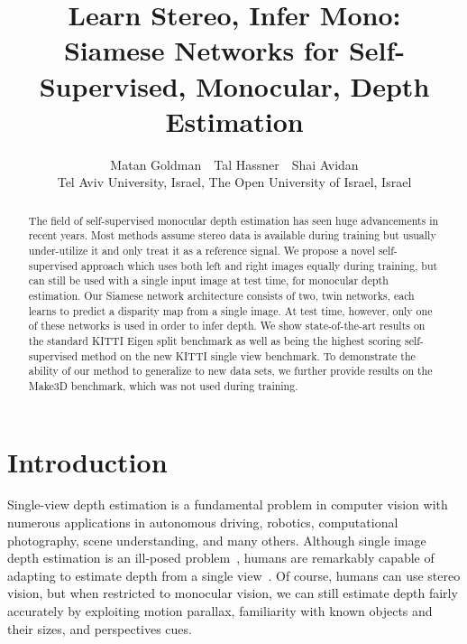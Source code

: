 \documentclass[10pt,twocolumn,letterpaper]{article}
\begin{document}
\title{Learn Stereo, Infer Mono:\\Siamese Networks for Self-Supervised, Monocular, Depth Estimation}


\renewcommand*{\Affilfont}{\small}
\setlength{\affilsep}{0.7em}

\author{
	Matan Goldman \,\,
	Tal Hassner \,\,
	Shai Avidan \vspace{3pt}\\
	Tel Aviv University, Israel, The Open University of Israel, Israel}



\maketitle

\renewcommand*{\thefootnote}{}
\setcounter{footnote}{1}
\renewcommand*{\thefootnote}{\arabic{footnote}}
\setcounter{footnote}{0}
\thispagestyle{empty}


\begin{abstract}
	The field of self-supervised monocular depth estimation has seen huge advancements in recent years. Most methods assume stereo data is available during training but usually under-utilize it and only treat it as a reference signal. We propose a novel self-supervised approach which uses both left and right images equally during training, but can still be used with a single input image at test time, for monocular depth estimation. Our Siamese network architecture consists of two, twin networks, each learns to predict a disparity map from a single image. At test time, however, only one of these networks is used in order to infer depth. We show state-of-the-art results on the standard KITTI Eigen split benchmark as well as being the highest scoring self-supervised method on the new KITTI single view benchmark. To demonstrate the ability of our method to generalize to new data sets, we further provide results on the Make3D benchmark, which was not used during training.
\end{abstract}

\section{Introduction}

Single-view depth estimation is a fundamental problem in computer vision with numerous applications in autonomous driving, robotics, computational photography, scene understanding, and many others. Although single image depth estimation is an ill-posed problem~\cite{eigen2014depth,hassner2006example}, humans are remarkably capable of adapting to estimate depth from a single view~\cite{howard2012perceiving}. Of course, humans can use stereo vision, but when restricted to monocular vision, we can still estimate depth fairly accurately by exploiting motion parallax, familiarity with known objects and their sizes, and perspectives cues.
\end{document}
